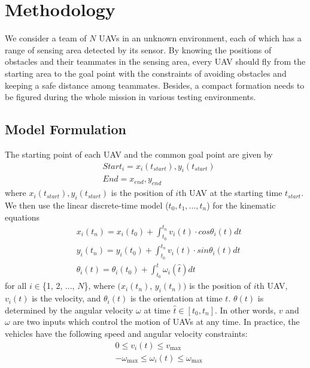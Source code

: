 \chapter{Methodology}
We consider a team of $N$ UAVs in an unknown environment, each of which has a range of sensing area detected by its sensor. By knowing the positions of obstacles and their teammates in the sensing area, every UAV should fly from the starting area to the goal point with the constraints of avoiding obstacles and keeping a safe distance among teammates. Besides, a compact formation needs to be figured during the whole mission in various testing environments.

\section{Model Formulation}

The starting point of each UAV and the common goal point are given by
\begin{equation}
\begin{aligned}
& Start_{i} = x_{i}(t_{start}),  y_{i}(t_{start}) \\
& End = x_{end},  y_{end}
\end{aligned}
\end{equation}
where $x_{i}(t_{start}), y_{i}(t_{start})$ is the position of $i$th UAV at the starting time $t_{start}$. We then use the linear discrete-time model ($t_{0}, t_{1}, ..., t_{n}$) for the kinematic equations
\begin{equation} 
\begin{aligned}
& x_{i}(t_{n}) = x_{i}(t_{0}) + \int_{t_{0}}^{t_{n}} v_{i}(t) \cdot cos\theta_{i}(t)dt \\
& y_{i}(t_{n}) = y_{i}(t_{0}) + \int_{t_{0}}^{t_{n}} v_{i}(t) \cdot sin\theta_{i}(t)dt \\
& \theta_{i}(t) = \theta_{i}(t_{0}) + \int_{t_{0}}^{t} \omega_{i}(\hat{t})dt
\end{aligned}
\end{equation}
for all $i\in$\{1, 2, ..., $N$\}, where $(x_{i}(t_{n})$, $y_{i}(t_{n}))$ is the position of $i$th UAV, $v_{i}(t)$ is the velocity, and $\theta_{i}(t)$ is the orientation at time $t$. $\theta(t)$ is determined by the angular velocity $\omega$ at time $\hat{t}\in[t_{0}, t_{n}]$. In other words, $v$ and $\omega$ are two inputs which control the motion of UAVs at any time. In practice, the vehicles have the following speed and angular velocity constraints: 
\begin{equation} 
\begin{aligned}
& 0\leq v_{i}(t)\leq v_{\max}\\
& -\omega_{\max}\leq\omega_{i}(t)\leq\omega_{\max}
\end{aligned}
\end{equation}

